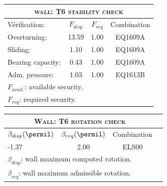 \begin{center}
\begin{tabular}[H]{|l|c|c|c|}
\hline
\multicolumn{4}{|c|}{\textsc{wall: T6 stability check}}\\
\hline
Vérification:  & $F_{disp}$ & $F_{req}$ & Combination\\
\hline
Overturning:  & 13.59 & 1.00 & EQ1609A\\
Sliding:  & 1.10 & 1.00 & EQ1609A\\
Bearing capacity:  & 0.43 & 1.00 & EQ1609A\\
Adm. pressure:  & 1.03 & 1.00 & EQ1613B\\
\hline
\multicolumn{4}{|l|}{$F_{avail.}$: available security.}\\
\multicolumn{4}{|l|}{$F_{req}$: required security.}\\
\hline
\end{tabular}
\end{center}
\begin{center}
\begin{tabular}[H]{|l|c|c|c|}
\hline
\multicolumn{3}{|c|}{\textsc{Wall: T6 rotation check}}\\
\hline
$\beta_{disp} (\permil)$ & $\beta_{req}(\permil)$ & Combination\\
\hline
-1.37 & 2.00 & ELS00\\
\hline
\multicolumn{3}{|l|}{$\beta_{disp}$: wall maximum computed rotation.}\\
\multicolumn{3}{|l|}{$\beta_{req}$: wall maximum admissible rotation.}\\
\hline
\end{tabular}
\end{center}
 \label{tb_T6}
\tablelasttail{\hline}
